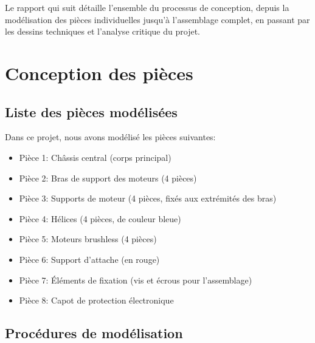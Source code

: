 \documentclass[a4paper,12pt]{report}
\begin{document}
Le rapport qui suit détaille l'ensemble du processus de conception, depuis la modélisation des pièces individuelles jusqu'à l'assemblage complet, en passant par les dessins techniques et l'analyse critique du projet.

\chapter{Conception des pièces}
\section{Liste des pièces modélisées}
Dans ce projet, nous avons modélisé les pièces suivantes:
\begin{itemize}
    \item Pièce 1: Châssis central (corps principal)
    \item Pièce 2: Bras de support des moteurs (4 pièces)
    \item Pièce 3: Supports de moteur (4 pièces, fixés aux extrémités des bras)
    \item Pièce 4: Hélices (4 pièces, de couleur bleue)
    \item Pièce 5: Moteurs brushless (4 pièces)
    \item Pièce 6: Support d'attache (en rouge)
    \item Pièce 7: Éléments de fixation (vis et écrous pour l'assemblage)
    \item Pièce 8: Capot de protection électronique
\end{itemize}

\section{Procédures de modélisation}
\end{document}
